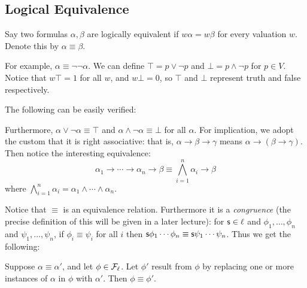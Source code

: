 \subsection{Logical Equivalence}

\bdefn

    Say two formulas $\alpha,\beta$ are {\emphcolor logically equivalent} if $w\alpha=w\beta$
    for every valuation $w$.
    Denote this by $\alpha\equiv\beta$.

\edefn

For example, $\alpha\equiv\neg\neg\alpha$.
We can define $\top=p\lor\neg p$ and $\bot=p\land\neg p$ for $p\in V$.
Notice that $w\top=1$ for all $w$, and $w\bot=0$, so $\top$ and $\bot$ represent truth and false
respectively.

The following can be easily verified:

\centerline{\vbox{\tabskip=1cm
\halign{&$#$\hfil\cr
    \alpha\land(\beta\land\gamma)\equiv(\alpha\land\beta)\land\gamma &
    \alpha\lor(\beta\lor\gamma)\equiv(\alpha\lor\beta)\lor\gamma \cr
    \alpha\land\beta\equiv\beta\land\alpha &
    \alpha\lor\beta\equiv\beta\lor\alpha\cr
    \alpha\land\alpha\equiv\alpha &
    \alpha\lor\alpha\equiv\alpha \cr
    \alpha\land(\beta\lor\gamma)\equiv(\alpha\land\beta)\lor(\alpha\land\gamma) &
    \alpha\lor(\beta\land\gamma)\equiv(\alpha\lor\beta)\land(\alpha\lor\gamma)\cr
    \neg(\alpha\land\beta)\equiv\neg\alpha\lor\neg\beta &
    \neg(\alpha\lor\beta)\equiv\neg\alpha\land\neg\beta\cr
}}}

Furthermore, $\alpha\lor\neg\alpha\equiv\top$ and $\alpha\land\neg\alpha\equiv\bot$ for all
$\alpha$.
For implication, we adopt the custom that it is right associative: that is,
$\alpha\to\beta\to\gamma$ means $\alpha\to(\beta\to\gamma)$.
Then notice the interesting equivalence:
$$ \alpha_1\to\cdots\to\alpha_n\to\beta \equiv \bigwedge_{i=1}^n\alpha_i\to\beta $$
where $\bigwedge_{i=1}^n\alpha_i=\alpha_1\wedge\cdots\wedge\alpha_n$.

Notice that $\equiv$ is an equivalence relation.
Furthermore it is a {\it congruence} (the precise definition of this will be given in a later
lecture): for ${\sf s}\in\ell$ and $\phi_1,\dots,\phi_n$ and $\psi_1,\dots,\psi_n$, if
$\phi_i\equiv\psi_i$ for all $i$ then ${\sf s}\phi_1\cdots\phi_n\equiv{\sf s}\psi_1\cdots\psi_n$.
Thus we get the following:

\blemm[title=The Replacement Lemma]

    Suppose $\alpha\equiv\alpha'$, and let $\phi\in{\cal F}_\ell$.
    Let $\phi'$ result from $\phi$ by replacing one or more instances of $\alpha$ in $\phi$ with
    $\alpha'$.
    Then $\phi\equiv\phi'$.

